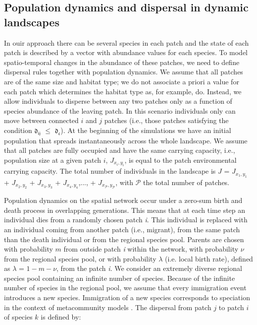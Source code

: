 \documentclass[12pt]{article}
\begin{document}
\subsection*{Population dynamics and dispersal in dynamic landscapes}

In ouir approach there can be several species in each patch and the state of each patch is described by a vector with abundance values for each species. To model spatio-temporal changes in the abundance of these patches, we need to
define dispersal rules together with population dynamics. We assume that all patches are of the same size and habitat type; we do not associate a priori a value for each patch which determines the habitat type as, for example, \cite{rybickihanski2013} do. Instead, we allow individuals to disperse between any two patches only as a
function of species abundance of the leaving patch. In this scenario
individuals only can move between connected $i$ and $j$ patches (i.e., those patches
satisfying the condition $\mathfrak{d_{ij}}$ $\leq$
$\mathfrak{d_{c}}$). At the beginning of the simulations we have an
initial population that spreads instantaneously across the whole
landscape. We assume that all patches are fully occupied and have the
same carrying capacity, i.e., population size at a given patch $i$,
$J_{x_i,y_i}$, is equal to the patch environmental carrying
capacity. The total number of individuals in the landscape is $J$ =
$J_{x_1,y_1}$ + $J_{x_2,y_2}$ + $J_{x_3,y_3}$ + $J_{x_4,y_4}$,..., +
$J_{x_\mathcal{P},y_\mathcal{P}}$, with $\mathcal{P}$ the total number
of patches.

Population dynamics on the spatial network occur under a zero-sum birth and
death process in overlapping generations. This means that at each time step an
individual dies from a randomly chosen patch {\em i}. This individual is
replaced with an individual coming from another patch (i.e., migrant), from the
same patch than the death individual or from the regional species pool. Parents
are chosen with probability $m$ from outside patch {\em i} within the network,
with probability $\nu$ from the regional species pool, or with probability
$\lambda$ (i.e. local birth rate), defined as $\lambda$ = $1 - m - \nu$, from
the patch {\em i}. We consider an extremely diverse regional species pool
containing an infinite number of species. Because of the infinite number of
species in the regional pool, we assume that every immigration event introduces
a new species. Immigration of a new species corresponds to speciation in the
context of metacommunity models \citep{Vanpeteghem&Haegeman:2010}. The
dispersal from patch $j$ to patch $i$ of species $k$ is defined by:
\end{document}
